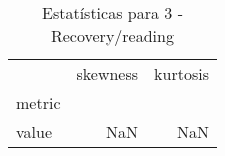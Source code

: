 \begin{table}[htbp]
\caption{Estatísticas para 3 - Recovery/reading}
\label{tab:3_-_recovery_reading_skewkurt}
\begin{tabular}{lrr}
\toprule
 & skewness & kurtosis \\
metric &  &  \\
\midrule
value & NaN & NaN \\
\bottomrule
\end{tabular}
\end{table}
